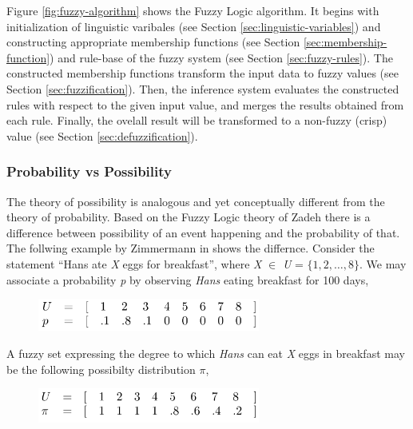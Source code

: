 \documentclass[11pt]{article}
\begin{document}
Figure \ref{fig:fuzzy-algorithm} shows the Fuzzy Logic algorithm. It begins
with initialization of linguistic varibales (see Section
\ref{sec:linguistic-variables}) and constructing appropriate membership
functions (see Section \ref{sec:membership-function}) and rule-base of the
fuzzy system (see Section \ref{sec:fuzzy-rules}). The constructed membership
functions transform the input data to fuzzy values (see Section
\ref{sec:fuzzification}). Then, the inference system evaluates the constructed
rules with respect to the given input value, and merges the results obtained
from each rule. Finally, the ovelall result will be transformed to a non-fuzzy
(crisp) value (see Section \ref{sec:defuzzification}).

\subsubsection{Probability vs Possibility}

The theory of possibility is analogous and yet conceptually different from the
theory of probability. Based on the Fuzzy Logic theory of Zadeh
\cite{zadeh:fuzzy} there is a difference between possibility of an event
happening and the probability of that. The follwing example by Zimmermann in
\cite{zimmermann:fuzzy-sets} shows the differnce. Consider the statement ``Hans
ate \textit{X} eggs for breakfast'', where \textit{X} $\in$ \textit{U} = $\{1,
2, \ldots, 8\}$. We may associate a probability \textit{p} by observing
\textit{Hans} eating breakfast for 100 days,

\begin{figure}[tbh]
  \center
  \includegraphics[width=0.65\textwidth]{figure/prob-poss-01.png}
  \label{fig:probability}
\end{figure}

A fuzzy set expressing the degree to which \textit{Hans} can eat \textit{X} eggs
in breakfast may be the following possibilty distribution $\pi$,

\begin{figure}[tbh]
  \center
  \includegraphics[width=0.65\textwidth]{figure/prob-poss-02.png}
  \label{fig:ppssibility}
\end{figure}
\end{document}
